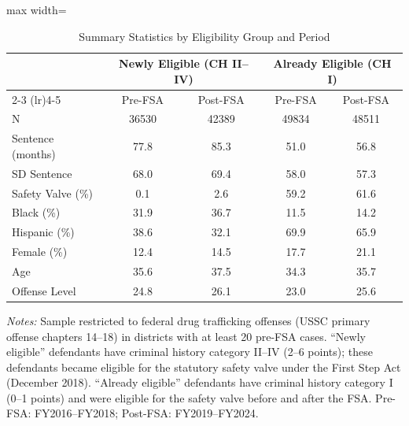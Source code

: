\begin{table}[H]
\centering
\caption{Summary Statistics by Eligibility Group and Period}
\label{tab:summary}
\begin{threeparttable}
\begin{adjustbox}{max width=\textwidth}
\begin{tabular}{lcccc}
\toprule
 & \multicolumn{2}{c}{Newly Eligible (CH II--IV)} & \multicolumn{2}{c}{Already Eligible (CH I)} \\
\cmidrule(lr){2-3} \cmidrule(lr){4-5}
 & Pre-FSA & Post-FSA & Pre-FSA & Post-FSA \\
\midrule
N & 36530 & 42389 & 49834 & 48511 \\
Sentence (months) & 77.8 & 85.3 & 51.0 & 56.8 \\
SD Sentence & 68.0 & 69.4 & 58.0 & 57.3 \\
Safety Valve (\%) & 0.1 & 2.6 & 59.2 & 61.6 \\
Black (\%) & 31.9 & 36.7 & 11.5 & 14.2 \\
Hispanic (\%) & 38.6 & 32.1 & 69.9 & 65.9 \\
Female (\%) & 12.4 & 14.5 & 17.7 & 21.1 \\
Age & 35.6 & 37.5 & 34.3 & 35.7 \\
Offense Level & 24.8 & 26.1 & 23.0 & 25.6 \\
\bottomrule
\end{tabular}
\end{adjustbox}
\begin{tablenotes}[flushleft]
\small
\item \textit{Notes:} Sample restricted to federal drug trafficking offenses (USSC primary offense chapters 14--18) in districts with at least 20 pre-FSA cases. ``Newly eligible'' defendants have criminal history category II--IV (2--6 points); these defendants became eligible for the statutory safety valve under the First Step Act (December 2018). ``Already eligible'' defendants have criminal history category I (0--1 points) and were eligible for the safety valve before and after the FSA. Pre-FSA: FY2016--FY2018; Post-FSA: FY2019--FY2024.
\end{tablenotes}
\end{threeparttable}
\end{table}

